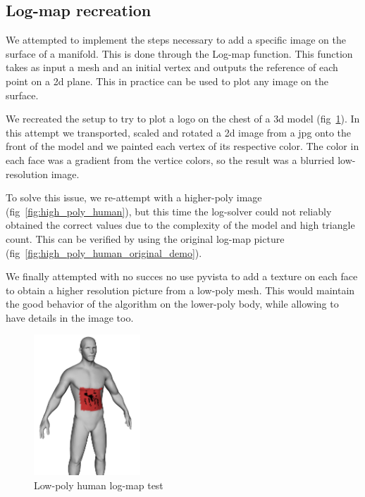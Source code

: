 \documentclass[sigconf]{acmart}
\begin{document}
\subsection{Log-map recreation}

We attempted to implement the steps necessary to add a specific image
on the surface of a manifold. This is done through the Log-map function.
This function takes as input a mesh and an initial vertex and outputs
the reference of each point on a 2d plane. This in practice can be used to
plot any image on the surface.

We recreated the setup to try to plot a logo on the chest of a 3d model
(fig~\ref{fig:low_poly_human}). In this attempt we transported, scaled and rotated a
2d image from a jpg onto the front of the model and we painted each
vertex of its respective color. The color in each face was a gradient from
the vertice colors, so the result was a blurried low-resolution image. 

To solve this issue, we re-attempt with a higher-poly image (fig~\ref{fig:high_poly_human}),
but this time the log-solver could not reliably obtained the correct values due to the complexity of the model
and high triangle count. This can be verified by using the original log-map
picture (fig~\ref{fig:high_poly_human_original_demo}).

We finally attempted with no succes no use pyvista to add a texture on each face
to obtain a higher resolution picture from a low-poly mesh. This would maintain
the good behavior of the algorithm on the lower-poly body, while allowing to
have details in the image too. 

\begin{figure}
  \centering
  \includegraphics[width=4cm]{human_spiderman.png}
  \caption{Low-poly human log-map test}
  \label{fig:low_poly_human}
\end{figure}
\end{document}
